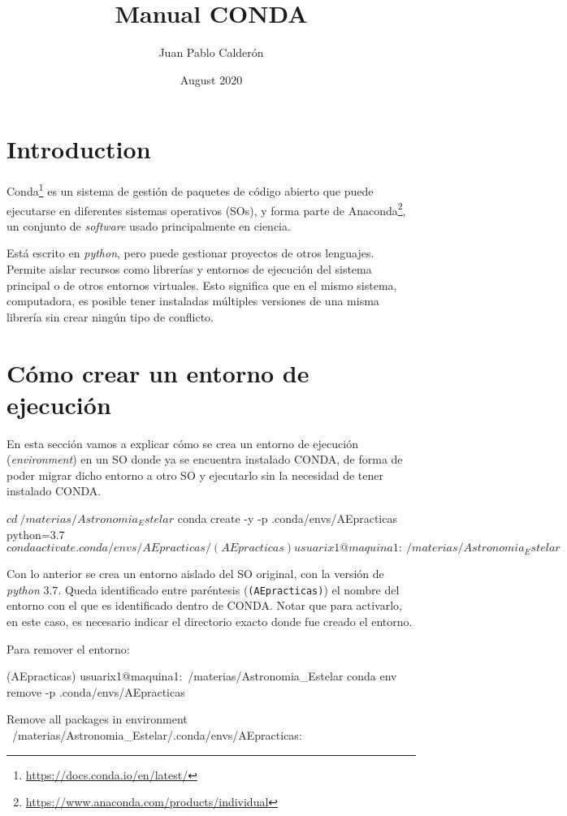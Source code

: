 \documentclass[a4paper, 12pt]{article}
\title{Manual CONDA}
\author{Juan Pablo Calderón}
\date{August 2020}
\begin{document}
\maketitle

\section{Introduction}
{\sc Conda}\footnote{\url{https://docs.conda.io/en/latest/}} es un sistema de gestión de paquetes de código abierto que puede ejecutarse en diferentes sistemas operativos (SOs), y forma parte de {\sc Anaconda}\footnote{\url{https://www.anaconda.com/products/individual}}, un conjunto de {\it software} usado principalmente en ciencia.

Está escrito en {\it python}, pero puede gestionar proyectos de otros lenguajes. Permite aislar recursos como librerías y entornos de ejecución del sistema principal o de otros entornos virtuales. Esto significa que en el mismo sistema, computadora, es posible tener instaladas múltiples versiones de una misma librería sin crear ningún tipo de conflicto.

\section{Cómo crear un entorno de ejecución}
En esta sección vamos a explicar cómo se crea un entorno de ejecución ({\it environment}) en un SO donde ya se encuentra instalado {\sc CONDA}, de forma de poder migrar dicho entorno a otro SO y ejecutarlo sin la necesidad de tener instalado {\sc CONDA}.

\begin{tcolorbox}
\begin{code}
$ cd ~/materias/Astronomia_Estelar 
$ conda create -y -p .conda/envs/AEpracticas python=3.7 
$ conda activate .conda/envs/AEpracticas/

(AEpracticas) usuarix1@maquina1:~/materias/Astronomia_Estelar$ 
\end{code}
\end{tcolorbox}

Con lo anterior se crea un entorno aislado del SO original, con la versión de {\it python} $3.7$. Queda identificado entre paréntesis 
(\verb|(AEpracticas)|) el nombre del entorno con el que es identificado dentro de {\sc CONDA}. Notar que para activarlo, en este caso, es necesario indicar el directorio exacto donde fue creado el entorno.

Para remover el entorno:
\begin{tcolorbox}
\begin{code}
(AEpracticas) usuarix1@maquina1:~/materias/Astronomia_Estelar$ 
$ conda env remove -p .conda/envs/AEpracticas

Remove all packages in environment      
     ~/materias/Astronomia_Estelar/.conda/envs/AEpracticas:
\end{code}
\end{tcolorbox}
\end{document}
